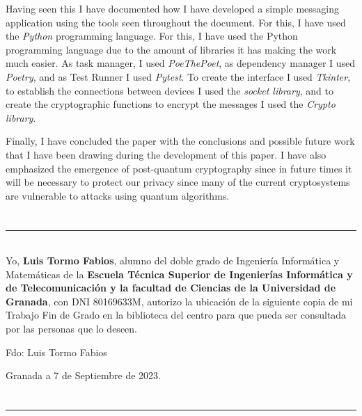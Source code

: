 Having seen this I have documented how I have developed a simple messaging application using the tools seen throughout the document. For this, I have used the \emph{Python} programming language. For this, I have used the Python programming language due to the amount of libraries it has making the work much easier. As task manager, I used \emph{PoeThePoet}, as dependency manager I used \emph{Poetry}, and as Test Runner I used \emph{Pytest}.
To create the interface I used \emph{Tkinter}, to establish the connections between devices I used the \emph{socket library}, and to create the cryptographic functions to encrypt the messages I used the \emph{Crypto library}.

Finally, I have concluded the paper with the conclusions and possible future work that I have been drawing during the development of this paper. I have also emphasized the emergence of post-quantum cryptography since in future times it will be necessary to protect our privacy since many of the current cryptosystems are vulnerable to attacks using quantum algorithms.
\chapter*{}
\thispagestyle{empty}

\noindent\rule[-1ex]{\textwidth}{2pt}\\[4.5ex]

Yo, \textbf{Luis Tormo Fabios}, alumno del doble grado de Ingeniería Informática y Matemáticas de la \textbf{Escuela Técnica Superior
de Ingenierías Informática y de Telecomunicación y la facultad de Ciencias de la Universidad de Granada}, con DNI 80169633M, autorizo la
ubicación de la siguiente copia de mi Trabajo Fin de Grado en la biblioteca del centro para que pueda ser
consultada por las personas que lo deseen.

\vspace{6cm}

\noindent Fdo: Luis Tormo Fabios

\vspace{2cm}

\begin{flushright}
Granada a 7 de Septiembre de 2023.
\end{flushright}


\chapter*{}
\thispagestyle{empty}

\noindent\rule[-1ex]{\textwidth}{2pt}\\[4.5ex]


